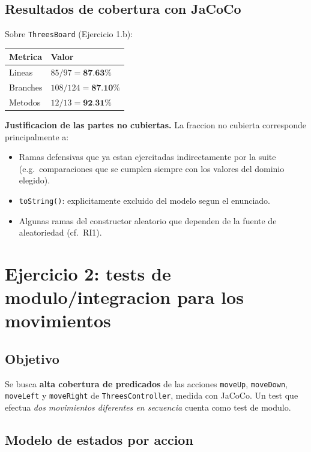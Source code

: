\documentclass[12pt,a4paper]{article}
\begin{document}
\subsection{Resultados de cobertura con JaCoCo}

Sobre \texttt{ThreesBoard} (Ejercicio 1.b):

\begin{center}
\begin{tabular}{ll}
\toprule
Metrica & Valor \\
\midrule
Lineas    & $85/97 = \textbf{87.63\%}$ \\
Branches  & $108/124 = \textbf{87.10\%}$ \\
Metodos   & $12/13 = \textbf{92.31\%}$ \\
\bottomrule
\end{tabular}
\end{center}

\textbf{Justificacion de las partes no cubiertas.} La fraccion no cubierta corresponde
principalmente a:

\begin{itemize}
  \item Ramas defensivas que ya estan ejercitadas indirectamente por la suite (e.g.\
  comparaciones que se cumplen siempre con los valores del dominio elegido).
  \item \texttt{toString()}: explicitamente excluido del modelo segun el enunciado.
  \item Algunas ramas del constructor aleatorio que dependen de la fuente de
  aleatoriedad (cf.\ RI1).
\end{itemize}

\section{Ejercicio 2: tests de modulo/integracion para los movimientos}

\subsection{Objetivo}

Se busca \textbf{alta cobertura de predicados} de las acciones \texttt{moveUp},
\texttt{moveDown}, \texttt{moveLeft} y \texttt{moveRight} de \texttt{ThreesController},
medida con JaCoCo. Un test que efectua \emph{dos movimientos diferentes en secuencia} cuenta
como test de modulo.

\subsection{Modelo de estados por accion}
\end{document}
